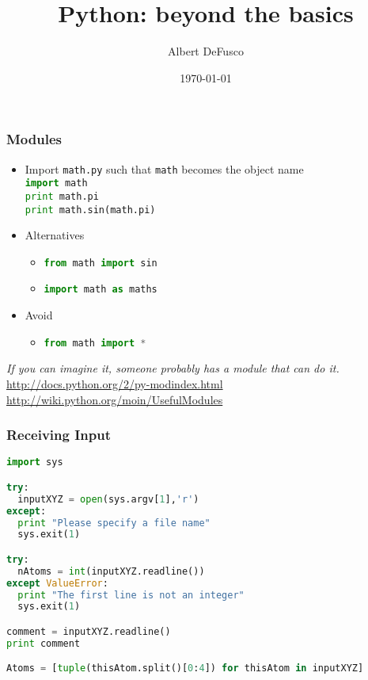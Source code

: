 \documentclass[xcolor=table,10pt,final]{beamer}
\begin{document}
\title{Python: beyond the basics}
\author{Albert DeFusco}
\date{\today}


\frame{\titlepage}
\begin{frame}
  \frametitle{Modules}
  \begin{itemize}
    \item Import {\tt math.py} such that {\tt math} becomes the object name\\
      \lstinline[language=python]|import math|\\
      \lstinline[language=python]|print math.pi|\\
      \lstinline[language=python]|print math.sin(math.pi)|
    \item Alternatives
      \begin{itemize}
        \item \lstinline[language=python]|from math import sin|
        \item \lstinline[language=python]|import math as maths|
      \end{itemize}
    \item Avoid
      \begin{itemize}
        \item \lstinline[language=python]|from math import *|
      \end{itemize}
  \end{itemize}
  \vskip1cm
{\it If you can imagine it, someone probably has a module that can do it.}\\
{\scriptsize \url{http://docs.python.org/2/py-modindex.html}}\\
{\scriptsize \url{http://wiki.python.org/moin/UsefulModules}}\\
\end{frame}

\begin{frame}[fragile]
  \frametitle{Receiving Input}
  \begin{lstlisting}[language=python]
import sys

try:
  inputXYZ = open(sys.argv[1],'r')
except:
  print "Please specify a file name"
  sys.exit(1)

try:
  nAtoms = int(inputXYZ.readline())
except ValueError:
  print "The first line is not an integer"
  sys.exit(1)

comment = inputXYZ.readline()
print comment

Atoms = [tuple(thisAtom.split()[0:4]) for thisAtom in inputXYZ]
  \end{lstlisting}

\end{frame}
\end{document}
